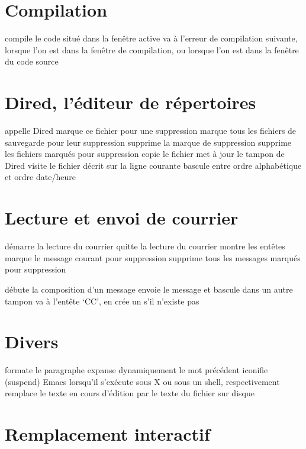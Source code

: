 \section{Compilation}

 compile le code situ\'e dans la fen\^etre active
 va \`a l'erreur de compilation suivante, lorsque l'on est
dans la fen\^etre de compilation, ou
 lorsque l'on est dans la fen\^etre du code source

\section{Dired, l'\'editeur de r\'epertoires}

  appelle Dired
 marque ce fichier pour une suppression
\key{\~{}} marque tous les fichiers de sauvegarde pour leur suppression
 supprime la marque de suppression
 supprime les fichiers marqu\'es pour suppression
 copie le fichier
 met \`a jour le tampon de Dired
 visite le fichier d\'ecrit sur la ligne courante
 bascule entre ordre alphab\'etique et ordre date/heure

\section{Lecture et envoi de courrier}

 d\'emarre la lecture du courrier
 quitte la lecture du courrier
 montre les ent\^etes
 marque le message courant pour suppression
 supprime tous les messages marqu\'es pour suppression

 d\'ebute la composition d'un message
 envoie le message et bascule dans un autre tampon
 va \`a l'ent\^ete `CC', en cr\'ee un s'il n'existe pas

\section{Divers}

 formate le paragraphe
 expanse dynamiquement le mot pr\'ec\'edent
 iconifie (suspend) Emacs lorsqu'il s'ex\'ecute sous X ou
  sous un shell, respectivement
 remplace le texte en cours d'\'edition par le
texte du fichier sur disque

\section{Remplacement interactif}

